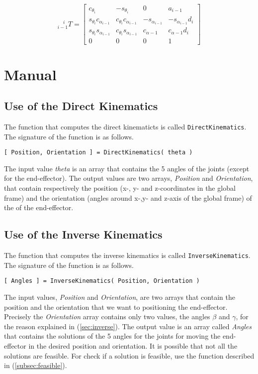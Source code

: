 \documentclass[a4paper,11pt]{article}
\begin{document}
\begin{equation}
_{i-1}^{\,\,\,\,\,\,\,i}T=\left[\begin{array}{cccc}
c_{\theta_{i}} & -s_{\theta_{i}} & 0 & a_{i-1}\\
s_{\theta_{i}}c_{\alpha_{i-1}} & c_{\theta_{i}}c_{\alpha_{i-1}} & -s_{\alpha_{i-1}} & -s_{\alpha_{i-1}}d_{i}\\
s_{\theta_{i}}s_{\alpha_{i-1}} & c_{\theta_{i}}s_{\alpha_{i-1}} & c_{\alpha-1} & c_{\alpha-1}d_{i}\\
0 & 0 & 0 & 1
\end{array}\right]
\label{eq:transfMatrix}
\end{equation}
\newline





\appendix
\section{Manual}
\subsection{Use of the Direct Kinematics}
\label{subsec:direct_kin}
The function that computes the direct kinematicts is called {\tt DirectKinematics}. The signature of the function is as follows.
\begin{verbatim}
[ Position, Orientation ] = DirectKinematics( theta )
\end{verbatim}

The input value \emph{theta} is an array that contains the 5 angles of the joints (except for the end-effector). The output values are two arrays, \emph{Position} and \emph{Orientation}, that contain respectively the position (x-, y- and z-coordinates in the global frame) and the orientation (angles around x-,y- and z-axis of the global frame) of the of the end-effector.

\subsection{Use of the Inverse Kinematics}
The function that computes the inverse kinematics is called {\tt InverseKinematics}. The signature of the function is as follows.
\begin{verbatim}
[ Angles ] = InverseKinematics( Position, Orientation )
\end{verbatim}

The input values, \emph{Position} and \emph{Orientation}, are two arrays that contain the position and the orientation that we want to positioning the end-effector. Precisely the \emph{Orientation} array contains only two values, the angles $\beta$ and $\gamma$, for the reason explained in (\ref{sec:inverse}). The output value is an array called \emph{Angles} that contains the solutions of the 5 angles for the joints for moving the end-effector in the desired position and orientation. 
It is possible that not all the solutions are feasible. For check if a solution is feasible, use the function described in (\ref{subsec:feasible}).
\end{document}
